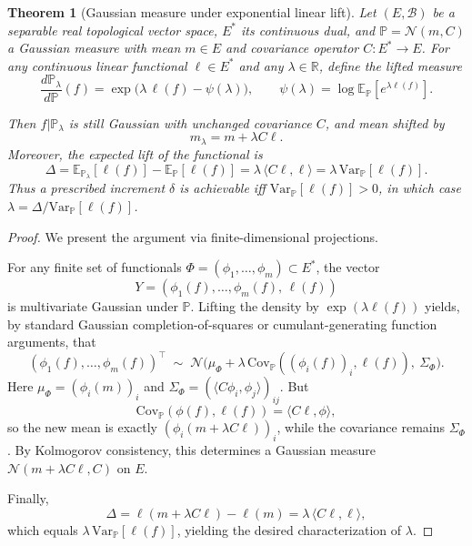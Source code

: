 \documentclass[10pt,a4paper]{amsart}
\newtheorem{theorem}{Theorem}
\begin{document}
\begin{theorem}[Gaussian measure under exponential linear lift]\label{app:the2}
 Let $(E,\mathcal B)$ be a separable real topological vector space, $E^*$ its continuous dual, and $\mathbb P=\mathcal N(m,C)$ a Gaussian measure with mean $m\in E$ and covariance operator $C:E^*\to E$.  
For any continuous linear functional $\ell\in E^*$ and any $\lambda\in\mathbb R$, define the lifted measure
\[
\frac{d\mathbb P_\lambda}{d\mathbb P}(f)
= \exp\!\big(\lambda\,\ell(f)-\psi(\lambda)\big),\qquad
\psi(\lambda)=\log\mathbb E_\mathbb P[e^{\lambda \ell(f)}].
\]

Then $f|\mathbb P_\lambda$ is still Gaussian with unchanged covariance $C$, and mean shifted by
\[
m_\lambda = m + \lambda C\ell.
\]
Moreover, the expected lift of the functional is
\[
\Delta = \mathbb E_{\mathbb P_\lambda}[\ell(f)] - \mathbb E_\mathbb P[\ell(f)]
= \lambda\,\langle C\ell,\ell\rangle
= \lambda\,\mathrm{Var}_\mathbb P[\ell(f)].
\]
Thus a prescribed increment $\delta$ is achievable iff $\mathrm{Var}_\mathbb P[\ell(f)]>0$, in which case $\lambda=\Delta/\mathrm{Var}_\mathbb P[\ell(f)]$.
\end{theorem}

\begin{proof}
We present the argument via finite-dimensional projections.

For any finite set of functionals $\Phi=(\phi_1,\dots,\phi_m)\subset E^*$, the vector
\[
Y=(\phi_1(f),\dots,\phi_m(f),\,\ell(f))
\]
is multivariate Gaussian under $\mathbb P$.  
Lifting the density by $\exp(\lambda \ell(f))$ yields, by standard Gaussian completion-of-squares or cumulant-generating function arguments, that
\[
(\phi_1(f),\dots,\phi_m(f))^\top \;\sim\; 
\mathcal N\!\big( \mu_\Phi + \lambda\,\mathrm{Cov}_\mathbb P((\phi_i(f))_i,\ell(f)),\ \Sigma_\Phi \big).
\]
Here $\mu_\Phi=(\phi_i(m))_i$ and $\Sigma_\Phi=(\langle C\phi_i,\phi_j\rangle)_{ij}$.  
But
\[
\mathrm{Cov}_\mathbb P(\phi(f),\ell(f))=\langle C\ell,\phi\rangle,
\]
so the new mean is exactly $(\phi_i(m+\lambda C\ell))_i$, while the covariance remains $\Sigma_\Phi$.  
By Kolmogorov consistency, this determines a Gaussian measure $\mathcal N(m+\lambda C\ell, C)$ on $E$.  

Finally,
\[
\Delta=\ell(m+\lambda C\ell)-\ell(m)
=\lambda\,\langle C\ell,\ell\rangle,
\]
which equals $\lambda\,\mathrm{Var}_\mathbb P[\ell(f)]$, yielding the desired characterization of $\lambda$.
\end{proof}
\end{document}

